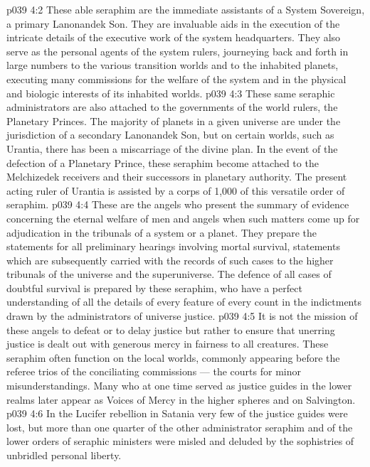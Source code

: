 \vs p039 4:2 \bibnobreakspace {} These able seraphim are the immediate assistants of a System Sovereign, a primary Lanonandek Son. They are invaluable aids in the execution of the intricate details of the executive work of the system headquarters. They also serve as the personal agents of the system rulers, journeying back and forth in large numbers to the various transition worlds and to the inhabited planets, executing many commissions for the welfare of the system and in the physical and biologic interests of its inhabited worlds.
\vs p039 4:3 These same seraphic administrators are also attached to the governments of the world rulers, the Planetary Princes. The majority of planets in a given universe are under the jurisdiction of a secondary Lanonandek Son, but on certain worlds, such as Urantia, there has been a miscarriage of the divine plan. In the event of the defection of a Planetary Prince, these seraphim become attached to the Melchizedek receivers and their successors in planetary authority. The present acting ruler of Urantia is assisted by a corps of 1,000 of this versatile order of seraphim.
\vs p039 4:4 \bibnobreakspace {} These are the angels who present the summary of evidence concerning the eternal welfare of men and angels when such matters come up for adjudication in the tribunals of a system or a planet. They prepare the statements for all preliminary hearings involving mortal survival, statements which are subsequently carried with the records of such cases to the higher tribunals of the universe and the superuniverse. The defence of all cases of doubtful survival is prepared by these seraphim, who have a perfect understanding of all the details of every feature of every count in the indictments drawn by the administrators of universe justice.
\vs p039 4:5 It is not the mission of these angels to defeat or to delay justice but rather to ensure that unerring justice is dealt out with generous mercy in fairness to all creatures. These seraphim often function on the local worlds, commonly appearing before the referee trios of the conciliating commissions --- the courts for minor misunderstandings. Many who at one time served as justice guides in the lower realms later appear as Voices of Mercy in the higher spheres and on Salvington.
\vs p039 4:6 In the Lucifer rebellion in Satania very few of the justice guides were lost, but more than one quarter of the other administrator seraphim and of the lower orders of seraphic ministers were misled and deluded by the sophistries of unbridled personal liberty.
